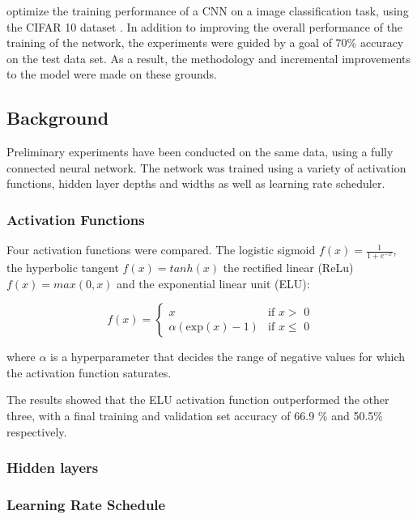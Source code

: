 \documentclass[]{article}
\begin{document}
optimize the training performance of a CNN on a image classification task, using the CIFAR 10 dataset \cite{cifar10}. In addition to improving the overall performance of the training of the network, the experiments were guided by a goal of 70\% accuracy on the test data set. As a result, the methodology and incremental improvements to the model were made on these grounds. 

\subsection{Background} \label{background}

Preliminary experiments have been conducted on the same data, using a fully connected neural network. The network was trained using a variety of activation functions, hidden layer depths and widths as well as learning rate scheduler. 

\subsubsection{Activation Functions}

Four activation functions were compared. The logistic sigmoid $f(x)=\frac{1}{1+e^{-x}}$, the hyperbolic tangent $f(x)=tanh(x)$ the rectified linear (ReLu) $f(x)=max(0,x)$ and the exponential linear unit (ELU):

\begin{equation} \label{eq:elu}
f(x) = \begin{cases}
x &\text{if $x >$ 0}\\ \alpha (\text{exp}(x) - 1) &\text{if  $x \leq$ 0}
\end{cases}
\end{equation}

where \(\alpha\) is a hyperparameter that decides the range of negative values for which the activation function saturates.

The results showed that the ELU activation function outperformed the other three, with a final training and validation set accuracy of 66.9 \% and 50.5\% respectively. 

\subsubsection{Hidden layers}

\subsubsection{Learning Rate Schedule}
\end{document}
